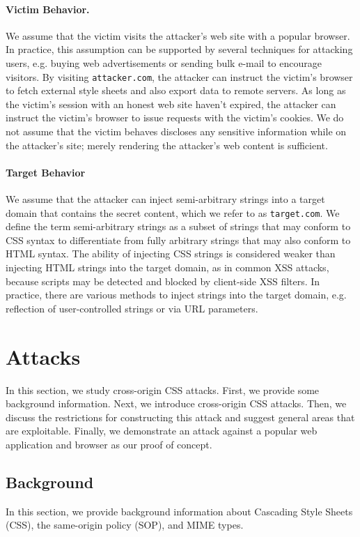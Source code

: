 \documentclass{acm_proc_article-sp}
\begin{document}
\paragraph{Victim Behavior.}
We assume that the victim visits the attacker's web site with a popular browser. In practice, this assumption can be supported by several techniques for attacking users, e.g. buying web advertisements or sending bulk e-mail to encourage visitors. By visiting \texttt{attacker.com}, the attacker can instruct the victim's browser to fetch external style sheets and also export data to remote servers. As long as the victim's session with an honest web site haven't expired, the attacker can instruct the victim's browser to issue requests with the victim's cookies.
We do not assume that the victim behaves discloses any sensitive information
while on the attacker's site; merely rendering the attacker's web content
is sufficient.

\paragraph{Target Behavior}
We assume that the attacker can inject semi-arbitrary strings into a target domain that contains the secret content, which we refer to as \texttt{target.com}. We define the term semi-arbitrary strings as a subset of strings that may conform to CSS syntax to differentiate from fully arbitrary strings that may also conform to HTML syntax. The ability of injecting CSS strings is considered weaker than injecting HTML strings into the target domain, as in common XSS attacks, because scripts may be detected and blocked by client-side XSS filters. In practice, there are various methods to inject strings into the target domain, e.g. reflection of user-controlled strings or via URL parameters.

\section{Attacks} \label{sec:attacks}
In this section, we study cross-origin CSS attacks. First, we provide some background information. Next, we introduce cross-origin CSS attacks. Then, we discuss the restrictions for constructing this attack and suggest general areas that are exploitable. Finally, we demonstrate an attack against a popular web application and browser as our proof of concept.

\subsection{Background}
In this section, we provide background information about Cascading Style Sheets (CSS), the same-origin policy (SOP), and MIME types.
\end{document}

